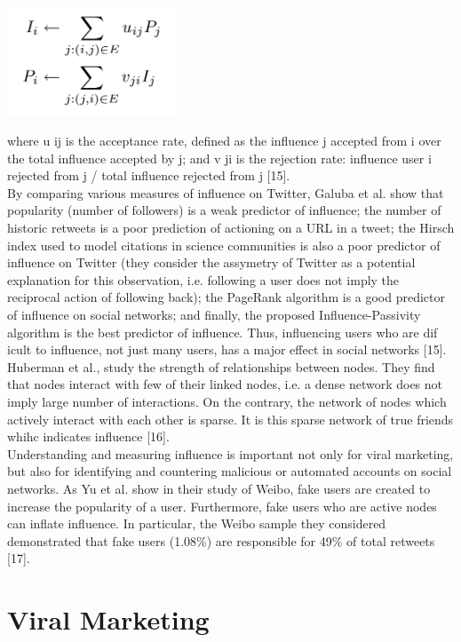 \documentclass[conference,letterpaper]{IEEEtran}
\begin{document}
\centerline{
  \includegraphics[width=2.0in]{influence_passivity.png}
}

where u ij is the acceptance rate, defined as the influence j accepted from i over the total influence accepted by j; and v ji is the rejection rate: influence user i rejected from j / total influence rejected from j [15].\\
By comparing various measures of influence on Twitter, Galuba et al. show that popularity (number of followers) is a weak predictor of influence; the number of historic retweets is a poor prediction of actioning on a URL in a tweet;
the Hirsch index used to model citations in science communities is also a poor predictor of influence on Twitter (they consider the assymetry of Twitter as a potential explanation for this observation, i.e. following a user does not imply the reciprocal action of following back);
the PageRank algorithm is a good predictor of influence on social networks; and finally, the proposed Influence-Passivity algorithm is the best predictor of influence. Thus, influencing users who are dif icult to influence, not just many users, has a major effect in social
networks [15].\\

\indent
Huberman et al., study the strength of relationships between nodes. They find that nodes interact with few of their linked nodes, i.e. a dense network does not imply large number of interactions. On the contrary, the network of nodes which actively interact with each other is sparse. It is this sparse network of true friends whihc indicates influence [16].\\
Understanding and measuring influence is important not only for viral marketing, but also for identifying and countering malicious or automated accounts on social networks. As Yu et al. show in their study of Weibo, fake users are created to increase the popularity of a user. Furthermore, fake users who are active nodes can inflate influence. In particular,
the Weibo sample they considered demonstrated that fake users (1.08\%) are responsible for 49\% of total retweets [17]. 

\section{Viral Marketing}
\end{document}
